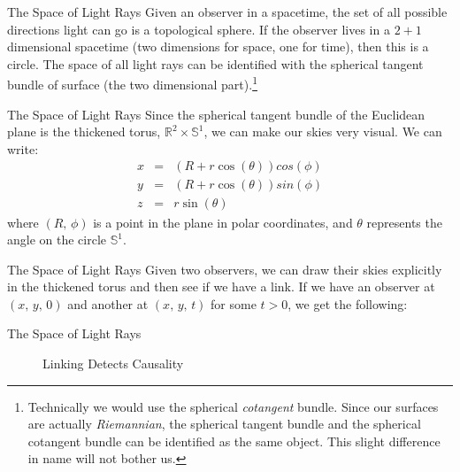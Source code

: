 \documentclass{beamer}
\begin{document}
    \begin{frame}{The Space of Light Rays}
        Given an observer in a spacetime, the set of all possible directions
        light can go is a topological sphere. If the observer lives in a
        $2+1$ dimensional spacetime (two dimensions for space, one for time),
        then this is a circle. The space of all light rays can be identified
        with the spherical tangent bundle of surface
        (the two dimensional part).\footnote{%
            Technically we would use the spherical \textit{cotangent} bundle.
            Since our surfaces are actually \textit{Riemannian}, the
            spherical tangent bundle and the spherical cotangent bundle can
            be identified as the same object. This slight difference in name
            will not bother us.
        }
    \end{frame}
    \begin{frame}{The Space of Light Rays}
        Since the spherical tangent bundle of the Euclidean plane is the
        thickened torus, $\mathbb{R}^{2}\times\mathbb{S}^{1}$, we can make
        our skies very visual. We can write:
        \begin{equation}
            \begin{array}{rcl}
                \displaystyle
                x
                &=&
                \displaystyle
                (R+r\cos(\theta))cos(\phi)\\
                \displaystyle
                y
                &=&
                \displaystyle
                (R+r\cos(\theta))sin(\phi)\\
                \displaystyle
                z
                &=&
                \displaystyle
                r\sin(\theta)
            \end{array}
        \end{equation}
        where $(R,\,\phi)$ is a point in the plane in polar coordinates,
        and $\theta$ represents the angle on the circle $\mathbb{S}^{1}$.
    \end{frame}
    \begin{frame}{The Space of Light Rays}
        Given two observers, we can draw their skies explicitly in the
        thickened torus and then see if we have a link. If we have
        an observer at $(x,\,y,\,0)$ and another at $(x,\,y,\,t)$ for some
        $t>0$, we get the following:
    \end{frame}
    \begin{frame}{The Space of Light Rays}
        \begin{figure}
            \centering
            \caption{Linking Detects Causality}
        \end{figure}
    \end{frame}
\end{document}
